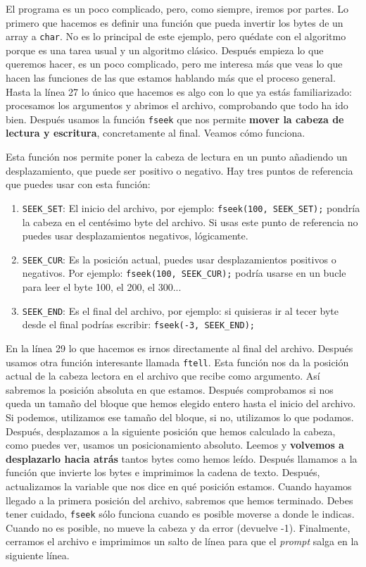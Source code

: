 \documentclass[a4paper]{article}
\begin{document}
El programa es un poco complicado, pero, como siempre, iremos por partes. Lo
primero que hacemos es definir una función que pueda invertir los bytes de un
array a \verb!char!. No es lo principal de este ejemplo, pero quédate con el
algoritmo porque es una tarea usual y un algoritmo clásico. Después empieza lo
que queremos hacer, es un poco complicado, pero me interesa más que veas lo que
hacen las funciones de las que estamos hablando más que el proceso general.
Hasta la línea 27 lo único que hacemos es algo con lo que ya estás
familiarizado: procesamos los argumentos y abrimos el archivo, comprobando que
todo ha ido bien. Después usamos la función \verb!fseek! que nos permite
\textbf{mover la cabeza de lectura y escritura}, concretamente al final. Veamos
cómo funciona.

Esta función nos permite poner la cabeza de lectura en un punto añadiendo un
desplazamiento, que puede ser positivo o negativo. Hay tres puntos de referencia
que puedes usar con esta función:
\begin{enumerate}
\item \verb!SEEK_SET!: El inicio del archivo, por ejemplo:
\verb!fseek(100, SEEK_SET);! pondría la cabeza en el centésimo byte del archivo.
Si usas este punto de referencia no puedes usar desplazamientos negativos,
lógicamente.
\item \verb!SEEK_CUR!: Es la posición actual, puedes usar desplazamientos
positivos o negativos. Por ejemplo: \verb!fseek(100, SEEK_CUR);! podría usarse
en un bucle para leer el byte 100, el 200, el 300...
\item \verb!SEEK_END!: Es el final del archivo, por ejemplo: si quisieras
ir al tecer byte desde el final podrías escribir: \verb!fseek(-3, SEEK_END);!
\end{enumerate}

En la línea 29 lo que hacemos es irnos directamente al final del archivo.
Después usamos otra función interesante llamada \verb!ftell!. Esta función nos
da la posición actual de la cabeza lectora en el archivo que recibe como
argumento. Así sabremos la posición absoluta en que estamos. Después comprobamos
si nos queda un tamaño del bloque que hemos elegido entero hasta el inicio del
archivo. Si podemos, utilizamos ese tamaño del bloque, si no, utilizamos
lo que podamos. Después, desplazamos a la siguiente posición que hemos calculado
la cabeza, como puedes ver, usamos un posicionamiento absoluto. Leemos y
\textbf{volvemos a desplazarlo hacia atrás} tantos bytes como hemos leído.
Después llamamos a la función que invierte los bytes e imprimimos la cadena
de texto. Después, actualizamos la variable que nos dice en qué posición
estamos. Cuando hayamos llegado a la primera posición del archivo, sabremos que
hemos terminado. Debes tener cuidado, \verb!fseek! sólo funciona cuando es
posible moverse a donde le indicas. Cuando no es posible, no mueve la cabeza y
da error (devuelve -1). Finalmente, cerramos el archivo e imprimimos un salto
de línea para que el \textit{prompt} salga en la siguiente línea.
\end{document}
